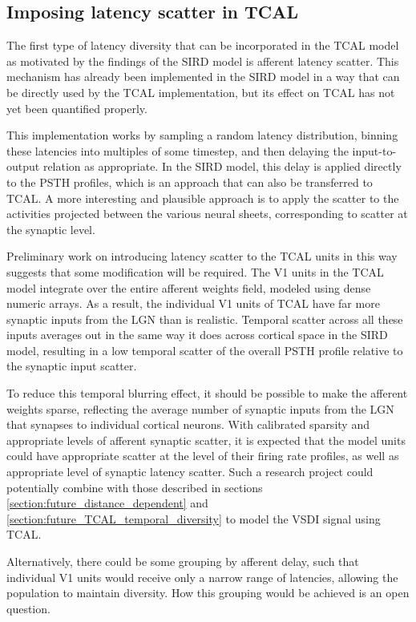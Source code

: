 \documentclass[phd,ianc,twoside]{infthesis}
\begin{document}
\subsection{Imposing latency scatter in TCAL}
\label{section:future_TCAL_latency_scatter}

The first type of latency diversity that can be incorporated in the TCAL model as
motivated by the findings of the SIRD model is afferent latency
scatter. This mechanism has already been implemented in the SIRD model
in a way that can be directly used by the TCAL implementation, but its effect on TCAL has
not yet been quantified properly.

This implementation works by sampling a random latency distribution,
binning these latencies into multiples of some timestep, and then
delaying the input-to-output relation as appropriate. In the SIRD model,
this delay is applied directly to the PSTH profiles, which is an approach that
can also be transferred to TCAL. A more interesting and plausible
approach is to apply the scatter to the activities projected between the
various neural sheets, corresponding to scatter at the synaptic level.

Preliminary work on introducing latency scatter to the TCAL units in this way
suggests that some modification will be required. The V1 units in the
TCAL model integrate over the entire afferent weights field,
modeled using dense numeric arrays.  As a result, the individual V1 units
of TCAL have far more synaptic inputs from the LGN than is
realistic. Temporal scatter across all these inputs averages out in the
same way it does across cortical space in the SIRD model, resulting in a
low temporal scatter of the overall PSTH profile relative to the synaptic
input scatter.

To reduce this temporal blurring effect, it should be possible to make
the afferent weights sparse, reflecting the average number of synaptic
inputs from the LGN that synapses to individual cortical neurons. With
calibrated sparsity and appropriate levels of afferent synaptic scatter,
it is expected that the model units could have appropriate scatter at
the level of their firing rate profiles, as well as appropriate level of
synaptic latency scatter. Such a research project could potentially
combine with those described in sections
\ref{section:future_distance_dependent} and
\ref{section:future_TCAL_temporal_diversity} to model the VSDI signal
using TCAL.

Alternatively, there could be some grouping by afferent delay, such
that individual V1 units would receive only a narrow range of
latencies, allowing the population to maintain diversity.  How this
grouping would be achieved is an open question. 
\end{document}

